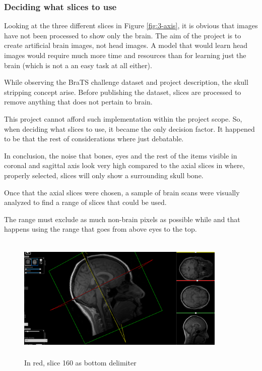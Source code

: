 \subsubsection*{Deciding what slices to use}

Looking at the three different slices in Figure \ref{fig:3-axis}, it is obvious that images have not been processed to show only the brain. The aim of the project is to create artificial brain images, not head images. A model that would learn head images would require much more time and resources than for learning just the brain (which is not a an easy task at all either).

While observing the BraTS \cite{brats} challenge dataset and project description, the skull stripping concept arise. Before publishing the dataset, slices are processed to remove anything that does not pertain to brain. 

This project cannot afford such implementation within the project scope. So, when deciding what slices to use, it became the only decision factor. It happened to be that the rest of considerations where just debatable. 

In conclusion, the noise that bones, eyes and the rest of the items visible in coronal and sagittal axis look very high compared to the axial slices in where, properly selected, slices will only show a surrounding skull bone.

Once that the axial slices were chosen, a sample of brain scans were visually analyzed to find a range of slices that could be used.

The range must exclude as much non-brain pixels as possible while and that happens using the range that goes from above eyes to the top.

\begin{figure}[ht]
    \centering
    \includegraphics[width = 10cm, height = 6cm]{images/nifti-slice160.png}
    \caption[]{In red, slice 160 as bottom delimiter}
    \label{fig:slice160}
\end{figure}

